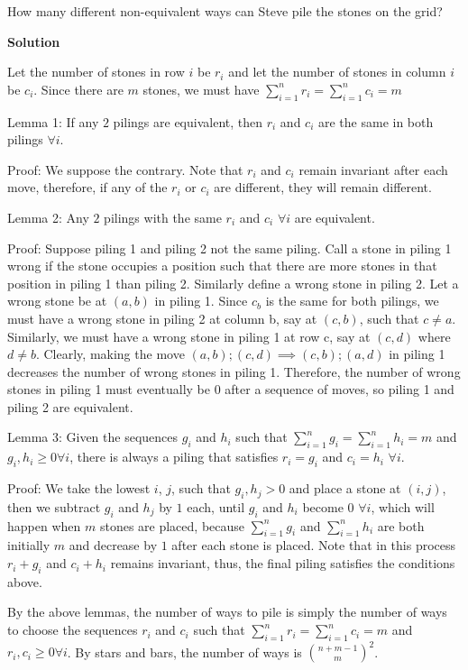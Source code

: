 \begin{enumerate}
 How many different non-equivalent ways can Steve pile the stones on the grid?


 



\textbf{Solution}

Let the number of stones in row $i$ be $r_i$ and let the number of stones in column $i$ be $c_i$. Since there are $m$ stones, we must have $\sum_{i=1}^n r_i=\sum_{i=1}^n c_i=m$

 Lemma 1: If any $2$ pilings are equivalent, then $r_i$ and $c_i$ are the same in both pilings $\forall i$.

 Proof: We suppose the contrary. Note that $r_i$ and $c_i$ remain invariant after each move, therefore, if any of the $r_i$ or $c_i$ are different, they will remain different.

 Lemma 2: Any $2$ pilings with the same $r_i$ and $c_i$ $\forall i$ are equivalent.

 Proof: Suppose piling 1 and piling 2 not the same piling. Call a stone in piling 1 wrong if the stone occupies a position such that there are more stones in that position in piling 1 than piling 2. Similarly define a wrong stone in piling 2. Let a wrong stone be at $(a, b)$ in piling 1. Since $c_b$ is the same for both pilings, we must have a wrong stone in piling 2 at column b, say at $(c, b)$, such that $c\not = a$. Similarly, we must have a wrong stone in piling 1 at row c, say at $(c, d)$ where $d \not = b$. Clearly, making the move $(a,b);(c,d) \implies (c,b);(a,d)$ in piling 1 decreases the number of wrong stones in piling 1. Therefore, the number of wrong stones in piling 1 must eventually be $0$ after a sequence of moves, so piling 1 and piling 2 are equivalent.

 Lemma 3: Given the sequences $g_i$ and $h_i$ such that $\sum_{i=1}^n g_i=\sum_{i=1}^n h_i=m$ and $g_i, h_i\geq 0 \forall i$, there is always a piling that satisfies $r_i=g_i$ and $c_i=h_i$ $\forall i$.

 Proof: We take the lowest $i$, $j$, such that $g_i, h_j >0$ and place a stone at $(i, j)$, then we subtract $g_i$ and $h_j$ by $1$ each, until $g_i$ and $h_i$ become $0$ $\forall i$, which will happen when $m$ stones are placed, because $\sum_{i=1}^n g_i$ and $\sum_{i=1}^n h_i$ are both initially $m$ and decrease by $1$ after each stone is placed. Note that in this process $r_i+g_i$ and $c_i+h_i$ remains invariant, thus, the final piling satisfies the conditions above.

 By the above lemmas, the number of ways to pile is simply the number of ways to choose the sequences $r_i$ and $c_i$ such that $\sum_{i=1}^n r_i=\sum_{i=1}^n c_i=m$ and $r_i, c_i \geq 0 \forall i$. By stars and bars, the number of ways is $\binom{n+m-1}{m}^{2}$.


\end{enumerate}
